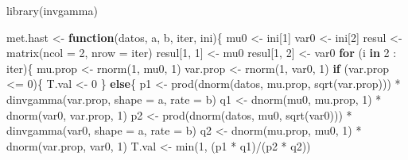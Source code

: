 \documentclass[
  10pt,
  spanish,
]{book}
\newenvironment{Shaded}{\begin{snugshade}}{\end{snugshade}}
\newcommand{\AttributeTok}[1]{\textcolor[rgb]{0.77,0.63,0.00}{#1}}
\newcommand{\ControlFlowTok}[1]{\textcolor[rgb]{0.13,0.29,0.53}{\textbf{#1}}}
\newcommand{\DecValTok}[1]{\textcolor[rgb]{0.00,0.00,0.81}{#1}}
\newcommand{\FunctionTok}[1]{\textcolor[rgb]{0.00,0.00,0.00}{#1}}
\newcommand{\NormalTok}[1]{#1}
\newcommand{\OtherTok}[1]{\textcolor[rgb]{0.56,0.35,0.01}{#1}}
\newcommand{\SpecialCharTok}[1]{\textcolor[rgb]{0.00,0.00,0.00}{#1}}
\theoremstyle{definition}
\theoremstyle{definition}
\theoremstyle{definition}
\theoremstyle{definition}
\theoremstyle{remark}
\begin{document}
\begin{Shaded}
\begin{Highlighting}[]
\FunctionTok{library}\NormalTok{(invgamma)}

\NormalTok{met.hast }\OtherTok{\textless{}{-}} \ControlFlowTok{function}\NormalTok{(datos, a, b, iter, ini)\{}
\NormalTok{  mu0 }\OtherTok{\textless{}{-}}\NormalTok{ ini[}\DecValTok{1}\NormalTok{] }
\NormalTok{  var0 }\OtherTok{\textless{}{-}}\NormalTok{ ini[}\DecValTok{2}\NormalTok{]}
\NormalTok{  resul }\OtherTok{\textless{}{-}} \FunctionTok{matrix}\NormalTok{(}\AttributeTok{ncol =} \DecValTok{2}\NormalTok{, }\AttributeTok{nrow =}\NormalTok{ iter)}
\NormalTok{  resul[}\DecValTok{1}\NormalTok{, }\DecValTok{1}\NormalTok{] }\OtherTok{\textless{}{-}}\NormalTok{ mu0}
\NormalTok{  resul[}\DecValTok{1}\NormalTok{, }\DecValTok{2}\NormalTok{] }\OtherTok{\textless{}{-}}\NormalTok{ var0}
  \ControlFlowTok{for}\NormalTok{ (i }\ControlFlowTok{in} \DecValTok{2} \SpecialCharTok{:}\NormalTok{ iter)\{}
\NormalTok{    mu.prop }\OtherTok{\textless{}{-}} \FunctionTok{rnorm}\NormalTok{(}\DecValTok{1}\NormalTok{, mu0, }\DecValTok{1}\NormalTok{)}
\NormalTok{    var.prop }\OtherTok{\textless{}{-}} \FunctionTok{rnorm}\NormalTok{(}\DecValTok{1}\NormalTok{, var0, }\DecValTok{1}\NormalTok{)}
    \ControlFlowTok{if}\NormalTok{ (var.prop }\SpecialCharTok{\textless{}=} \DecValTok{0}\NormalTok{)\{ T.val }\OtherTok{\textless{}{-}} \DecValTok{0}\NormalTok{ \}}
    \ControlFlowTok{else}\NormalTok{\{}
\NormalTok{      p1 }\OtherTok{\textless{}{-}} \FunctionTok{prod}\NormalTok{(}\FunctionTok{dnorm}\NormalTok{(datos, mu.prop, }\FunctionTok{sqrt}\NormalTok{(var.prop))) }\SpecialCharTok{*}
        \FunctionTok{dinvgamma}\NormalTok{(var.prop, }\AttributeTok{shape =}\NormalTok{ a, }\AttributeTok{rate =}\NormalTok{ b)}
\NormalTok{      q1 }\OtherTok{\textless{}{-}} \FunctionTok{dnorm}\NormalTok{(mu0, mu.prop, }\DecValTok{1}\NormalTok{) }\SpecialCharTok{*}
        \FunctionTok{dnorm}\NormalTok{(var0, var.prop, }\DecValTok{1}\NormalTok{)}
\NormalTok{      p2 }\OtherTok{\textless{}{-}} \FunctionTok{prod}\NormalTok{(}\FunctionTok{dnorm}\NormalTok{(datos, mu0, }\FunctionTok{sqrt}\NormalTok{(var0))) }\SpecialCharTok{*} 
        \FunctionTok{dinvgamma}\NormalTok{(var0, }\AttributeTok{shape =}\NormalTok{ a, }\AttributeTok{rate =}\NormalTok{ b)}
\NormalTok{      q2 }\OtherTok{\textless{}{-}} \FunctionTok{dnorm}\NormalTok{(mu.prop, mu0, }\DecValTok{1}\NormalTok{) }\SpecialCharTok{*} 
        \FunctionTok{dnorm}\NormalTok{(var.prop, var0, }\DecValTok{1}\NormalTok{)}
\NormalTok{      T.val }\OtherTok{\textless{}{-}} \FunctionTok{min}\NormalTok{(}\DecValTok{1}\NormalTok{, (p1 }\SpecialCharTok{*}\NormalTok{ q1)}\SpecialCharTok{/}\NormalTok{(p2 }\SpecialCharTok{*}\NormalTok{ q2))}

\end{Highlighting}
\end{Shaded}
\end{document}

